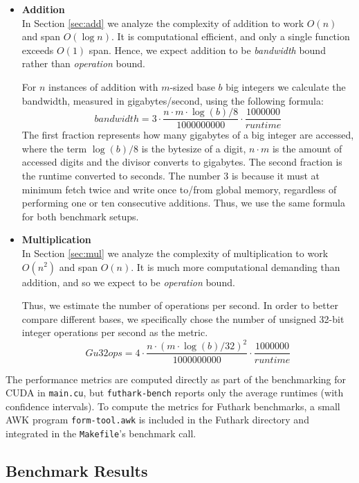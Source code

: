 \begin{itemize}[leftmargin=*]
\item \textbf{Addition}\\
  In Section \ref{sec:add} we analyze the complexity of addition to work $O(n)$
  and span $O(\log n)$. It is computational efficient, and only a single
   function exceeds $O(1)$ span. Hence, we expect addition to be
  \textit{bandwidth} bound rather than \textit{operation} bound.

  For $n$ instances of addition with $m$-sized base $b$ big integers we
  calculate the bandwidth, measured in gigabytes/second, using the following
  formula:
  \begin{equation}
    \label{eq:bandwidth}
    \mathit{bandwidth} = 3 \cdot \dfrac{n \cdot m \cdot \log(b)/8}{1000000000} \cdot \dfrac{1000000}{\mathit{runtime}}
  \end{equation}
  The first fraction represents how many gigabytes of a big integer are
  accessed, where the term $\log(b) / 8$ is the bytesize of a digit, $n\cdot m$ is
  the amount of accessed digits and the divisor converts to gigabytes. The
  second fraction is the runtime converted to seconds. The number 3 is because
  it must at minimum fetch twice and write once to/from global memory,
  regardless of performing one or ten consecutive additions. Thus, we use the
  same formula for both benchmark setups.
  

\item \textbf{Multiplication}\\
  In Section \ref{sec:mul} we analyze the complexity of multiplication to work
  $O(n^2)$ and span $O(n)$. It is much more computational demanding than
  addition, and so we expect to be \textit{operation} bound.

  Thus, we estimate the number of operations per second. In order to better
  compare different bases, we specifically chose the number of unsigned 32-bit
  integer operations per second as the metric.
  \begin{equation}
  \label{eq:u32ops}
  \mathit{Gu32ops} = 4\cdot \dfrac{n \cdot (m \cdot \log(b) / 32)^2}{1000000000} \cdot \dfrac{1000000}{\mathit{runtime}}
  \end{equation}
\end{itemize}

The performance metrics are computed directly as part of the benchmarking for
CUDA in \texttt{main.cu}, but \texttt{futhark-bench} reports only the average
runtimes (with confidence intervals). To compute the metrics for Futhark
benchmarks, a small AWK program \texttt{form-tool.awk} is included in the
Futhark directory and integrated in the \texttt{Makefile}'s benchmark call.

\subsection{Benchmark Results}
\label{subsec:benchres}



